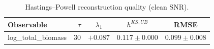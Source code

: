 \begin{table}[ht]
\centering
\begin{tabular}{lrccc}
\hline
Observable & $\tau$ & $\lambda_1$ & $h^{KS,UB}$ & RMSE \\
\hline
log\_total\_biomass & 30 & $+0.087$ & $0.117\pm0.000$ & $0.099\pm0.008$ \\
\hline
\end{tabular}
\caption{Hastings--Powell reconstruction quality (clean SNR).}
\label{tab:hastings_powell}
\end{table}
